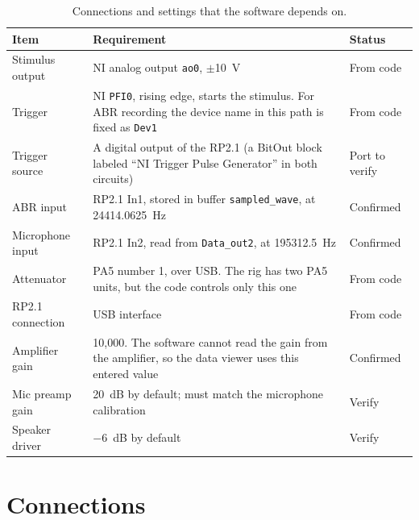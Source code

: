 \begin{table}[htbp]
\centering
\caption{Connections and settings that the software depends on.}
\label{tab:connections}
\begin{tabularx}{\textwidth}{@{}lXl@{}}
\toprule
Item & Requirement & Status \\
\midrule
Stimulus output & NI analog output \texttt{ao0}, $\pm$10~V & From code \\
Trigger & NI \texttt{PFI0}, rising edge, starts the stimulus. For ABR recording the
  device name in this path is fixed as \texttt{Dev1} & From code \\
Trigger source & A digital output of the RP2.1 (a BitOut block labeled ``NI Trigger Pulse
  Generator'' in both circuits) & Port to verify \\
ABR input & RP2.1 In1, stored in buffer \texttt{sampled\_wave}, at
  24414.0625~Hz & Confirmed \\
Microphone input & RP2.1 In2, read from \texttt{Data\_out2}, at
  195312.5~Hz & Confirmed \\
Attenuator & PA5 number 1, over USB. The rig has two PA5 units, but the code controls
  only this one & From code \\
RP2.1 connection & USB interface & From code \\
Amplifier gain & 10,000. The software cannot read the gain from the amplifier, so the
  data viewer uses this entered value & Confirmed \\
Mic preamp gain & 20~dB by default; must match the microphone calibration & Verify \\
Speaker driver & $-$6~dB by default & Verify \\
\bottomrule
\end{tabularx}
\end{table}



\section{Connections}


